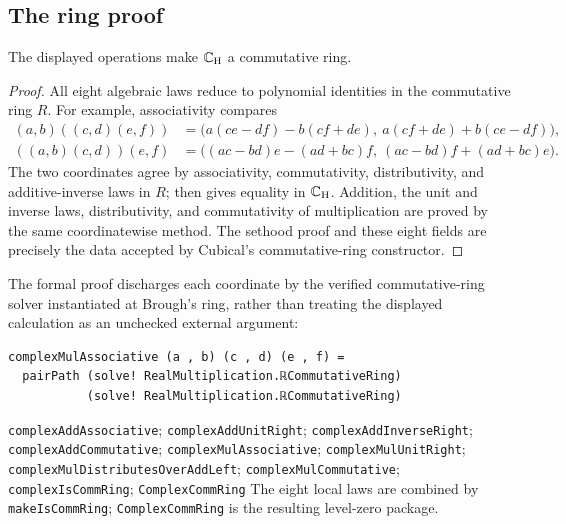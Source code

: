 \subsection{The ring proof}
\begin{proposition}
The displayed operations make $\mathbb{C}_{\mathrm H}$ a commutative ring.
\end{proposition}
\begin{proof}
All eight algebraic laws reduce to polynomial identities in the commutative
ring $R$.  For example, associativity compares
\begin{align*}
(a,b)((c,d)(e,f))&=\bigl(a(ce-df)-b(cf+de),\ a(cf+de)+b(ce-df)\bigr),\\
((a,b)(c,d))(e,f)&=\bigl((ac-bd)e-(ad+bc)f,\ (ac-bd)f+(ad+bc)e\bigr).
\end{align*}
The two coordinates agree by associativity, commutativity, distributivity,
and additive-inverse laws in $R$;  then gives equality in
$\mathbb{C}_{\mathrm H}$.  Addition, the unit and inverse laws, distributivity, and
commutativity of multiplication are proved by the same coordinatewise
method.  The sethood proof and these eight fields are precisely the data
accepted by Cubical's commutative-ring constructor.
\end{proof}

The formal proof discharges each coordinate by the verified commutative-ring
solver instantiated at Brough's ring, rather than treating the displayed
calculation as an unchecked external argument:
\begin{verbatim}
complexMulAssociative (a , b) (c , d) (e , f) =
  pairPath (solve! RealMultiplication.ℝCommutativeRing)
           (solve! RealMultiplication.ℝCommutativeRing)
\end{verbatim}
{\texttt{complexAddAssociative}; \texttt{complexAddUnitRight}; \texttt{complexAddInverseRight}; \texttt{complexAddCommutative}; \texttt{complexMulAssociative}; \texttt{complexMulUnitRight}; \texttt{complexMulDistributesOverAddLeft}; \texttt{complexMulCommutative}; \texttt{complexIsCommRing}; \texttt{ComplexCommRing}}
{The eight local laws are combined by \texttt{makeIsCommRing}; \texttt{ComplexCommRing} is the resulting level-zero package.}
